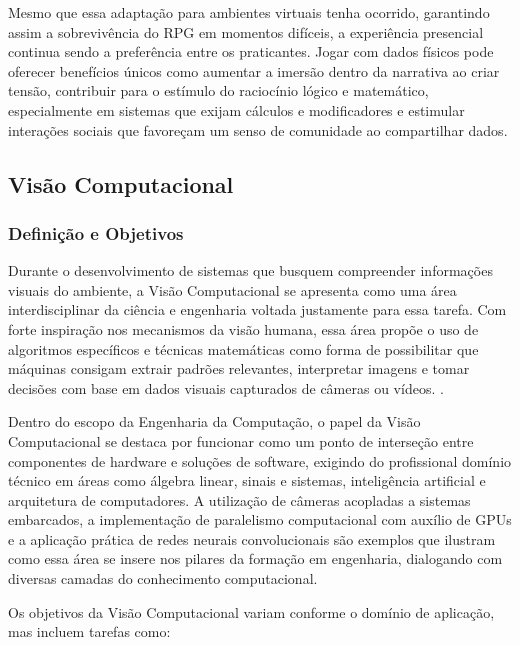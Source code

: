 Mesmo que essa adaptação para ambientes virtuais tenha ocorrido, garantindo assim a sobrevivência do RPG em momentos difíceis, 
a experiência presencial continua sendo a preferência entre os praticantes. Jogar com dados físicos pode oferecer benefícios 
únicos como aumentar a imersão dentro da narrativa ao criar tensão, contribuir para o estímulo do raciocínio lógico e matemático, 
especialmente em sistemas que exijam cálculos e modificadores \cite{vieira2019} e estimular interações sociais que favoreçam um 
senso de comunidade ao compartilhar dados.


\subsection{Visão Computacional}

\subsubsection{Definição e Objetivos}

Durante o desenvolvimento de sistemas que busquem compreender informações visuais do ambiente, a Visão Computacional 
se apresenta como uma área interdisciplinar da ciência e engenharia voltada justamente para essa tarefa. Com forte 
inspiração nos mecanismos da visão humana, essa área propõe o uso de algoritmos específicos e técnicas matemáticas 
como forma de possibilitar que máquinas consigam extrair padrões relevantes, interpretar imagens e tomar decisões 
com base em dados visuais capturados de câmeras ou vídeos.
\cite{szeliski2010computer}.

Dentro do escopo da Engenharia da Computação, o papel da Visão Computacional se destaca por funcionar como 
um ponto de interseção entre componentes de hardware e soluções de software, exigindo do profissional domínio 
técnico em áreas como álgebra linear, sinais e sistemas, inteligência artificial e arquitetura de computadores. 
A utilização de câmeras acopladas a sistemas embarcados, a implementação de paralelismo computacional com auxílio 
de GPUs e a aplicação prática de redes neurais convolucionais são exemplos que ilustram como essa área se insere 
nos pilares da formação em engenharia, dialogando com diversas camadas do conhecimento computacional.\cite{bishop2006pattern}

Os objetivos da Visão Computacional variam conforme o domínio de aplicação, mas incluem tarefas como:

